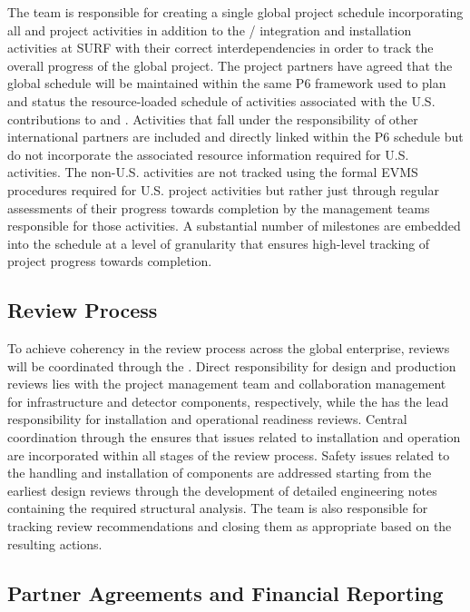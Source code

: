The  team is responsible for creating a single global
project schedule incorporating all  and 
project activities in addition to the /
integration and installation activities at SURF with their correct
interdependencies in order to track the overall progress of the global
project.  The project partners have agreed that the global schedule
will be maintained within the same P6 framework used to plan and
status the resource-loaded schedule of activities associated with the
U.S. contributions to  and .  Activities that
fall under the responsibility of other international partners are
included and directly linked within the P6 schedule but do not
incorporate the associated resource information required for
U.S. activities.  The non-U.S. activities are not tracked using the
formal EVMS procedures required for U.S. project activities but rather
just through regular assessments of their progress towards completion
by the management teams responsible for those activities.  A
substantial number of milestones are embedded into the schedule at a
level of granularity that ensures high-level tracking of project
progress towards completion.

\subsection{Review Process}
\label{sec:dune_review}

To achieve coherency in the review process across the global
enterprise, reviews will be coordinated through the .
Direct responsibility for design and production reviews lies with the
 project management team and  collaboration
management for infrastructure and detector components, respectively,
while the  has the lead responsibility for installation and
operational readiness reviews.  Central coordination through the
 ensures that issues related to installation and operation
are incorporated within all stages of the review process.  Safety
issues related to the handling and installation of components are
addressed starting from the earliest design reviews through the
development of detailed engineering notes containing the required
structural analysis.  The  team is also responsible for
tracking review recommendations and closing them as appropriate based
on the resulting actions.

\subsection{Partner Agreements and Financial Reporting}
\label{sec:dune_agreements}

